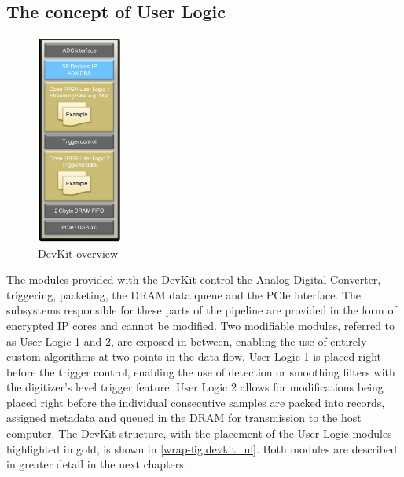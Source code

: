 \documentclass[12pt]{article}
\begin{document}
	\subsection{The concept of User Logic}
		\begin{figure}
			\includegraphics[width=0.25\textwidth]{img/devkit_ul.png}
			\caption{DevKit overview}\label{wrap-fig:devkit_ul}
		\end{figure}
		The modules provided with the DevKit control the Analog Digital Converter, triggering,
		packeting, the DRAM data queue and the PCIe interface. The subsystems responsible for these
		parts of the pipeline are provided in the form of encrypted IP cores and cannot be modified.
		Two modifiable modules, referred to as User Logic 1 and 2, are exposed in between,
		enabling the use of entirely custom algorithms at two points in the data flow.
		User Logic 1 is placed right before the trigger control, enabling the use of
		detection or smoothing filters with the digitizer's level trigger feature.
		User Logic 2 allows for modifications being placed right before the individual consecutive
		samples are packed into records, assigned metadata and queued in the DRAM for transmission to the
		host computer. The DevKit structure, with the placement of the User Logic modules highlighted in gold,
		is shown in \autoref{wrap-fig:devkit_ul}. Both modules are described in greater detail in the next chapters.
		\par
		\newpage
\end{document}
